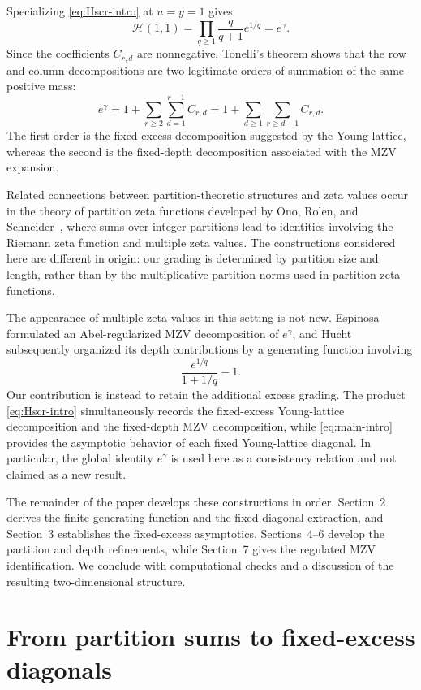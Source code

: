 \documentclass[11pt]{article}
\theoremstyle{definition}
\begin{document}
Specializing \eqref{eq:Hscr-intro} at $u=y=1$ gives
\[
 \mathscr H(1,1)
 =
 \prod_{q\geq1}
 \frac{q}{q+1}e^{1/q}
 =
 e^\gamma.
\]
Since the coefficients $C_{r,d}$ are nonnegative, Tonelli's theorem
shows that the row and column decompositions are two legitimate
orders of summation of the same positive mass:
\[
 e^\gamma
 =
 1+\sum_{r\geq2}\sum_{d=1}^{r-1}C_{r,d}
 =
 1+\sum_{d\geq1}\sum_{r\geq d+1}C_{r,d}.
\]
The first order is the fixed-excess decomposition suggested by the
Young lattice, whereas the second is the fixed-depth decomposition
associated with the MZV expansion.

Related connections between partition-theoretic structures and zeta
values occur in the theory of partition zeta functions developed by
Ono, Rolen, and Schneider~\cite{OnoRolenSchneider}, where sums over
integer partitions lead to identities involving the Riemann zeta
function and multiple zeta values.  The constructions considered here
are different in origin: our grading is determined by partition size
and length, rather than by the multiplicative partition norms used in
partition zeta functions.

The appearance of multiple zeta values in this setting is not new.
Espinosa formulated an Abel-regularized MZV decomposition of
$e^\gamma$, and Hucht subsequently organized its depth contributions
by a generating function involving
\[
        \frac{e^{1/q}}{1+1/q}-1.
\]
Our contribution is instead to retain the additional excess grading.
The product \eqref{eq:Hscr-intro} simultaneously records the
fixed-excess Young-lattice decomposition and the fixed-depth MZV
decomposition, while \eqref{eq:main-intro} provides the asymptotic
behavior of each fixed Young-lattice diagonal.  In particular, the
global identity $e^\gamma$ is used here as a consistency relation and
not claimed as a new result.

The remainder of the paper develops these constructions in order.
Section~2 derives the finite generating function and the fixed-diagonal
extraction, and Section~3 establishes the fixed-excess asymptotics.
Sections~4--6 develop the partition and depth refinements, while
Section~7 gives the regulated MZV identification.  We conclude with
computational checks and a discussion of the resulting
two-dimensional structure.

\section{From partition sums to fixed-excess diagonals}
\label{sec:finite}
\end{document}
